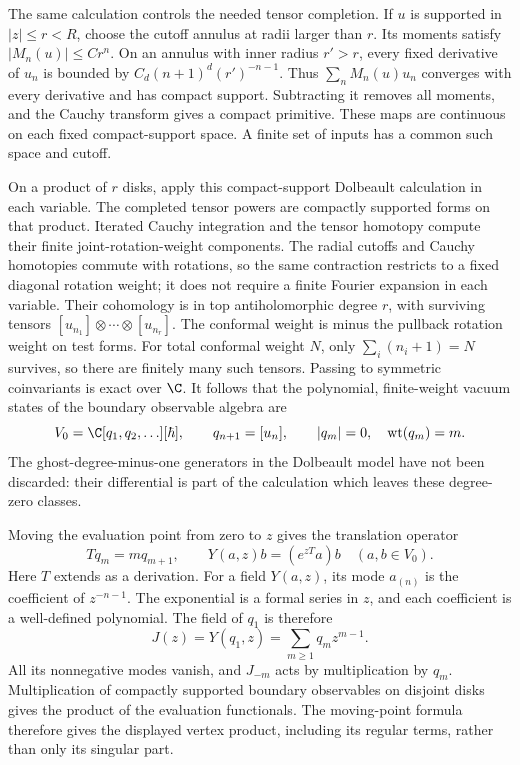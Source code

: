 The same calculation controls the needed tensor completion.  If $u$
is supported in $|z|\le r<R$, choose the cutoff annulus at radii
larger than $r$.  Its moments satisfy $|M_n(u)|\le C r^n$.
On an annulus with inner radius $r'>r$, every fixed derivative of
$u_n$ is bounded by $C_d(n+1)^d(r')^{-n-1}$.
Thus $\sum_n M_n(u)u_n$ converges with every derivative and has
compact support.  Subtracting it removes all moments, and the
Cauchy transform gives a compact primitive.  These maps are continuous
on each fixed compact-support space.  A finite set of inputs has a
common such space and cutoff.

On a product of $r$ disks, apply this compact-support Dolbeault
calculation in each variable.  The completed tensor powers are
compactly supported forms on that product.  Iterated Cauchy integration
and the tensor homotopy compute their finite joint-rotation-weight
components.  The radial cutoffs and Cauchy homotopies commute with rotations,
so the same contraction restricts to a fixed diagonal rotation weight;
it does not require a finite Fourier expansion in each variable.
Their cohomology is in top antiholomorphic degree $r$,
with surviving tensors $[u_{n_1}]\otimes\cdots\otimes[u_{n_r}]$.
The conformal weight is minus the pullback rotation weight on test
forms.  For total conformal weight $N$, only
$\sum_i(n_i+1)=N$ survives, so there are finitely many such tensors.
Passing to symmetric coinvariants is exact over $\C$.
It follows that the polynomial, finite-weight vacuum states of the
boundary observable algebra are
\[
 V_0=\C[q_1,q_2,\ldots][\hbar],\qquad
       q_{n+1}=[u_n],\qquad |q_m|=0,\quad\mathrm{wt}(q_m)=m.
\]
The ghost-degree-minus-one generators in the Dolbeault model have
not been discarded: their differential is part of the calculation
which leaves these degree-zero classes.

Moving the evaluation point from zero to $z$ gives the translation
operator
\[
 Tq_m=mq_{m+1},\qquad
 Y(a,z)b=(e^{zT}a)b\quad(a,b\in V_0).
\]
Here $T$ extends as a derivation.  For a field $Y(a,z)$, its mode
$a_{(n)}$ is the coefficient of $z^{-n-1}$.  The exponential is a formal series
in $z$, and each coefficient is a well-defined polynomial.
The field of $q_1$ is therefore
\[
 J(z)=Y(q_1,z)=\sum_{m\ge1}q_m z^{m-1}.
\]
All its nonnegative modes vanish, and $J_{-m}$ acts by multiplication
by $q_m$.  Multiplication of compactly supported boundary observables
on disjoint disks gives the product of the evaluation functionals.
The moving-point formula therefore gives the displayed vertex
product, including its regular terms, rather than only its singular
part.

